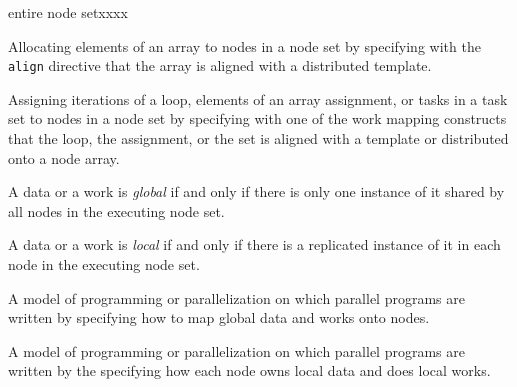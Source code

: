 \begin{namelist}{entire node setxxxx}


      Allocating elements of an array to nodes in a node set by
      specifying with the {\tt align} directive that the array is
      aligned with a distributed template.



      Assigning iterations of a loop, elements of an array assignment,
      or tasks in a task set to nodes in a node set by specifying with
      one of the work mapping constructs that the loop, the assignment,
      or the set is aligned with a template or distributed onto a node
      array.

%


      A data or a work is {\it global} if and only if there is only one
      instance of it shared by all nodes in the executing node set.


      A data or a work is {\it local} if and only if there is a
      replicated instance of it in each node in the executing node set.


      A model of programming or parallelization on which parallel
      programs are written by specifying how to map global data and
      works onto nodes.


      A model of programming or parallelization on which parallel
      programs are written by the specifying how each node owns local
      data and does local works.


%

\end{namelist}


